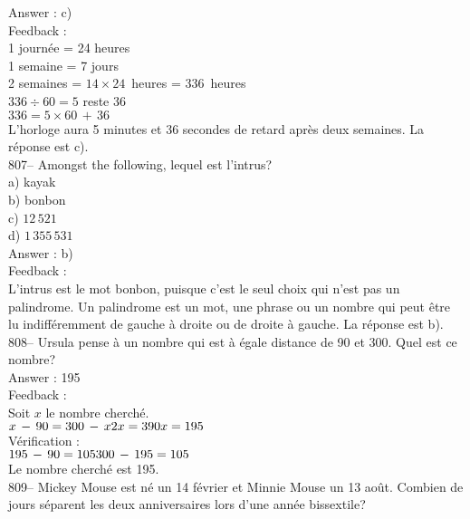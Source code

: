 ﻿\documentclass[letterpaper, 12pt]{article}
\begin{document}
Answer : c)\\

Feedback : \\
1 journ\'ee = 24 heures\\
1 semaine = 7 jours\\
2 semaines = $14\times24$~heures = 336~heures\\
$336\div60=5$ reste 36\\
$336=5\times60\,+\,36$\\
L'horloge aura 5 minutes et 36 secondes de retard apr\`es deux semaines.  La
r\'eponse est c).\\

807-- Amongst the following, lequel est l'intrus?\\
a) kayak\\
b) bonbon\\
c) $12\,521$\\
d) $1\,355\,531$\\

Answer : b)\\

Feedback : \\
L'intrus est le mot bonbon, puisque c'est le seul choix qui n'est pas un
palindrome.  Un palindrome est un mot, une phrase ou un nombre qui peut
\^etre lu indiff\'eremment de gauche \`a droite ou de droite \`a gauche.  La
r\'eponse est b).\\

808-- Ursula pense \`a un nombre qui est \`a \'egale distance de 90 et 300.
Quel est ce nombre?\\

Answer : 195\\

Feedback : \\
Soit $x$ le nombre cherch\'e.\\

$x\,-\,90=300\,-\,x\\
2x=390\\
x=195$\\

V\'erification : \\
$195\,-\,90=105\\
300\,-\,195=105$\\

Le nombre cherch\'e est 195.\\

809-- Mickey Mouse est n\'e un 14 f\'evrier et Minnie Mouse un 13 ao\^ut.
Combien de jours s\'eparent les deux anniversaires lors d'une ann\'ee
bissextile?\\
\end{document}
